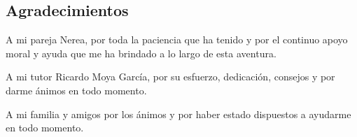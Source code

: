 \begin{flushright}
	\section*{Agradecimientos}
	A mi pareja Nerea, por toda la paciencia que ha tenido y por el continuo apoyo moral y ayuda que me ha brindado a lo largo de esta aventura.
	 
	A mi tutor Ricardo Moya García, por su esfuerzo, dedicación, consejos y por darme ánimos en todo momento.
	
	A mi familia y amigos por los ánimos y por haber estado dispuestos a ayudarme en todo momento.
\end{flushright}